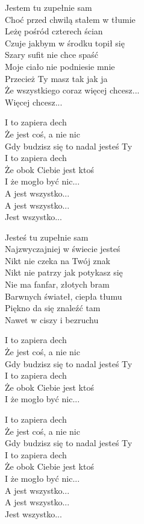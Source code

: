 \begin{text}
    \hfill\break
    Jestem tu zupełnie sam\\
    Choć przed chwilą stałem w tłumie\\
    Leżę pośród czterech ścian\\
    Czuje jakbym w środku topił się\\
    Szary sufit nie chce spaść\\
    Moje ciało nie podniesie mnie\\
    Przecież Ty masz tak jak ja\\
    Że wszystkiego coraz więcej chcesz...\\
    Więcej chcesz...

    \vin I to zapiera dech\\
    \vin Że jest coś, a nie nic\\
    \vin Gdy budzisz się to nadal jesteś Ty\\
    \vin I to zapiera dech\\
    \vin Że obok Ciebie jest ktoś\\
    \vin I że mogło być nic...\\
    \vin A jest wszystko...\\
    \vin A jest wszystko...\\
    \vin Jest wszystko...

    Jesteś tu zupełnie sam\\
    Najzwyczajniej w świecie jesteś\\
    Nikt nie czeka na Twój znak\\
    Nikt nie patrzy jak potykasz się\\
    Nie ma fanfar, złotych bram\\
    Barwnych świateł, ciepła tłumu\\
    Piękno da się znaleźć tam\\
    Nawet w ciszy i bezruchu

    \vin I to zapiera dech\\
    \vin Że jest coś, a nie nic\\
    \vin Gdy budzisz się to nadal jesteś Ty\\
    \vin I to zapiera dech\\
    \vin Że obok Ciebie jest ktoś\\
    \vin I że mogło być nic...

    \vin I to zapiera dech\\
    \vin Że jest coś, a nie nic\\
    \vin Gdy budzisz się to nadal jesteś Ty\\
    \vin I to zapiera dech\\
    \vin Że obok Ciebie jest ktoś\\
    \vin I że mogło być nic...\\
    \vin A jest wszystko...\\
    \vin A jest wszystko...\\
    \vin Jest wszystko...


\end{text}
